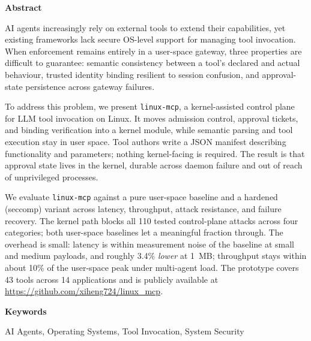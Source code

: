 \onehalfspacing
{} %
{\fontsize{16pt}{30pt}\selectfont \noindent\textbf{Abstract}}
\vspace{0.5cm}
{\fontsize{12pt}{18pt}\selectfont

AI agents increasingly rely on external tools to extend their capabilities, yet existing frameworks lack secure OS-level support for managing tool invocation. 
When enforcement remains entirely in a user-space gateway, three properties are difficult to guarantee: semantic consistency between a tool's declared and actual behaviour, trusted identity binding resilient to session confusion, and approval-state persistence across gateway failures.

To address this problem, we present \texttt{linux-mcp}, a kernel-assisted control plane for LLM tool invocation on Linux.
It moves admission control, approval tickets, and binding verification into a kernel module, while semantic parsing and tool execution stay in user space.
Tool authors write a JSON manifest describing functionality and parameters; nothing kernel-facing is required.
The result is that approval state lives in the kernel, durable across daemon failure and out of reach of unprivileged processes.

We evaluate \texttt{linux-mcp} against a pure user-space baseline and a hardened (seccomp) variant across latency, throughput, attack resistance, and failure recovery.
The kernel path blocks all 110 tested control-plane attacks across four categories; both user-space baselines let a meaningful fraction through.
The overhead is small: latency is within measurement noise of the baseline at small and medium payloads, and roughly 3.4\% \emph{lower} at 1~MB; throughput stays within about 10\% of the user-space peak under multi-agent load.
The prototype covers 43 tools across 14 applications and is publicly available at \url{https://github.com/xiheng724/linux_mcp}.

}
\vspace{0.5cm}
{\fontsize{16pt}{30pt}\selectfont \noindent\textbf{Keywords}}
\vspace{0.5cm}
{\fontsize{12pt}{18pt}\selectfont

AI Agents, Operating Systems, Tool Invocation, System Security

}


